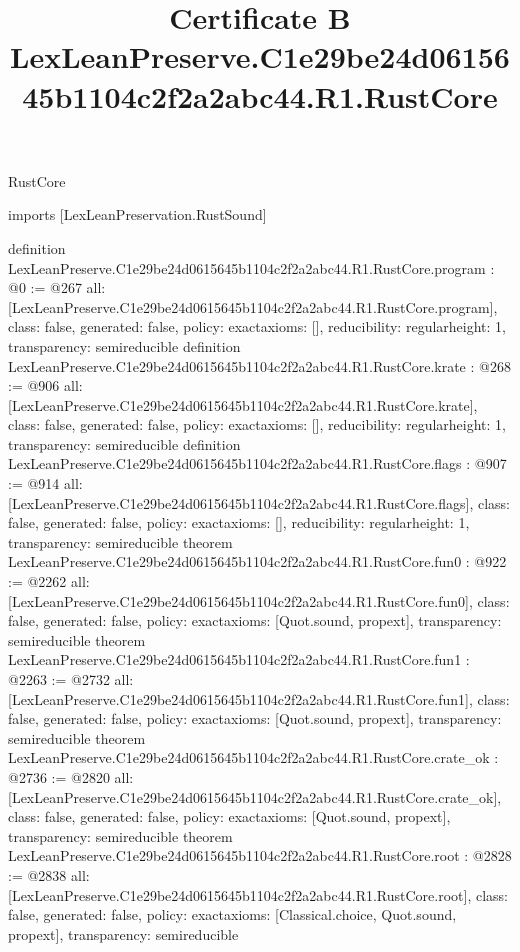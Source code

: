 \begin{lexlean}{RustCore}
\title{Certificate B LexLeanPreserve.C1e29be24d0615645b1104c2f2a2abc44.R1.RustCore}
\begin{coremodule}
imports [LexLeanPreservation.RustSound]

definition LexLeanPreserve.C1e29be24d0615645b1104c2f2a2abc44.R1.RustCore.program : @0 := @267 {
  all: [LexLeanPreserve.C1e29be24d0615645b1104c2f2a2abc44.R1.RustCore.program],
  class: false,
  generated: false,
  policy: exact{axioms: []},
  reducibility: regular{height: 1},
  transparency: semireducible
}
definition LexLeanPreserve.C1e29be24d0615645b1104c2f2a2abc44.R1.RustCore.krate : @268 := @906 {
  all: [LexLeanPreserve.C1e29be24d0615645b1104c2f2a2abc44.R1.RustCore.krate],
  class: false,
  generated: false,
  policy: exact{axioms: []},
  reducibility: regular{height: 1},
  transparency: semireducible
}
definition LexLeanPreserve.C1e29be24d0615645b1104c2f2a2abc44.R1.RustCore.flags : @907 := @914 {
  all: [LexLeanPreserve.C1e29be24d0615645b1104c2f2a2abc44.R1.RustCore.flags],
  class: false,
  generated: false,
  policy: exact{axioms: []},
  reducibility: regular{height: 1},
  transparency: semireducible
}
theorem LexLeanPreserve.C1e29be24d0615645b1104c2f2a2abc44.R1.RustCore.fun0 : @922 := @2262 {
  all: [LexLeanPreserve.C1e29be24d0615645b1104c2f2a2abc44.R1.RustCore.fun0],
  class: false,
  generated: false,
  policy: exact{axioms: [Quot.sound, propext]},
  transparency: semireducible
}
theorem LexLeanPreserve.C1e29be24d0615645b1104c2f2a2abc44.R1.RustCore.fun1 : @2263 := @2732 {
  all: [LexLeanPreserve.C1e29be24d0615645b1104c2f2a2abc44.R1.RustCore.fun1],
  class: false,
  generated: false,
  policy: exact{axioms: [Quot.sound, propext]},
  transparency: semireducible
}
theorem LexLeanPreserve.C1e29be24d0615645b1104c2f2a2abc44.R1.RustCore.crate_ok : @2736 := @2820 {
  all: [LexLeanPreserve.C1e29be24d0615645b1104c2f2a2abc44.R1.RustCore.crate_ok],
  class: false,
  generated: false,
  policy: exact{axioms: [Quot.sound, propext]},
  transparency: semireducible
}
theorem LexLeanPreserve.C1e29be24d0615645b1104c2f2a2abc44.R1.RustCore.root : @2828 := @2838 {
  all: [LexLeanPreserve.C1e29be24d0615645b1104c2f2a2abc44.R1.RustCore.root],
  class: false,
  generated: false,
  policy: exact{axioms: [Classical.choice, Quot.sound, propext]},
  transparency: semireducible
}


\end{coremodule}
\end{lexlean}

